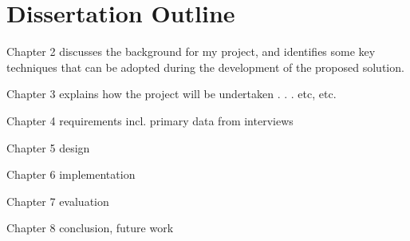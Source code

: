\section{Dissertation Outline}  %

Chapter 2 discusses the background for my project, and identifies some key techniques that can be adopted during the development 
of the proposed solution.  

Chapter 3 explains how the project will be undertaken . . . etc, etc.  

Chapter 4 requirements incl. primary data from interviews

Chapter 5 design

Chapter 6 implementation

Chapter 7 evaluation

Chapter 8 conclusion, future work






